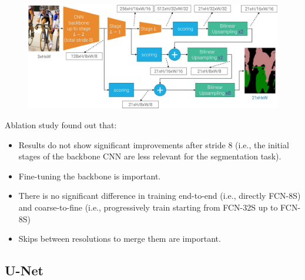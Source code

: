 \begin{description}
\begin{description}
\begin{descriptionlist}
                        \begin{figure}[H]
                            \raggedleft
                            \includegraphics[width=0.85\linewidth]{./img/_fcn_8.jpg}
                        \end{figure}
                \end{descriptionlist}

                \begin{remark}
                    Ablation study found out that:
                    \begin{itemize}
                        \item Results do not show significant improvements after stride $8$ (i.e., the initial stages of the backbone CNN are less relevant for the segmentation task).
                        \item Fine-tuning the backbone is important.
                        \item There is no significant difference in training end-to-end (i.e., directly FCN-8S) and coarse-to-fine (i.e., progressively train starting from FCN-32S up to FCN-8S)
                        \item Skips between resolutions to merge them are important.
                    \end{itemize}
                \end{remark}
        \end{description}
\end{description}


\subsection{U-Net}


